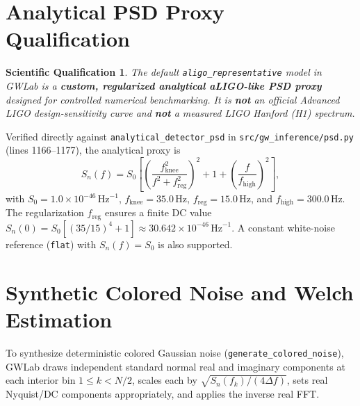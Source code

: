 \documentclass[11pt,a4paper]{report}
\newtheorem{remark}{Scientific Qualification}
\begin{document}
\section{Analytical PSD Proxy Qualification}
\begin{remark}
The default \texttt{aligo\_representative} model in GWLab is a \textbf{custom, regularized analytical aLIGO-like PSD proxy} designed for controlled numerical benchmarking. It is \textbf{not} an official Advanced LIGO design-sensitivity curve and \textbf{not} a measured LIGO Hanford (H1) spectrum.
\end{remark}
Verified directly against \texttt{analytical\_detector\_psd} in \texttt{src/gw\_inference/psd.py} (lines 1166--1177), the analytical proxy is
\begin{equation}
S_n(f) = S_0 \left[ \left(\frac{f_{\mathrm{knee}}^2}{f^2 + f_{\mathrm{reg}}^2}\right)^{\!2} + 1 + \left(\frac{f}{f_{\mathrm{high}}}\right)^{\!2} \right],
\end{equation}
with $S_0 = 1.0 \times 10^{-46}\,\mathrm{Hz}^{-1}$, $f_{\mathrm{knee}} = 35.0\,\mathrm{Hz}$, $f_{\mathrm{reg}} = 15.0\,\mathrm{Hz}$, and $f_{\mathrm{high}} = 300.0\,\mathrm{Hz}$. The regularization $f_{\mathrm{reg}}$ ensures a finite DC value $S_n(0) = S_0[(35/15)^4 + 1] \approx 30.642 \times 10^{-46}\,\mathrm{Hz}^{-1}$. A constant white-noise reference (\texttt{flat}) with $S_n(f) = S_0$ is also supported.

\section{Synthetic Colored Noise and Welch Estimation}
To synthesize deterministic colored Gaussian noise (\texttt{generate\_colored\_noise}), GWLab draws independent standard normal real and imaginary components at each interior bin $1 \le k < N/2$, scales each by $\sqrt{S_n(f_k)/(4\Delta f)}$, sets real Nyquist/DC components appropriately, and applies the inverse real FFT.
\end{document}
